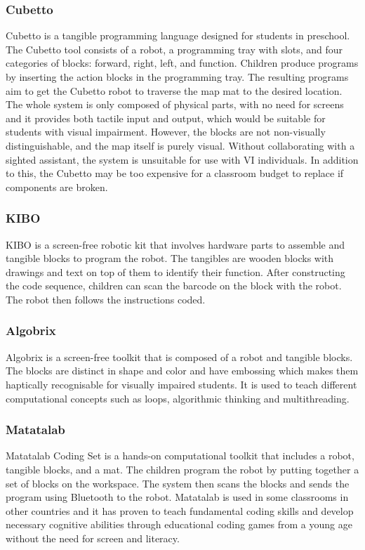 \documentclass[oneside,%
                    author={Malak Hajji},
                    degree={BSc},
                    title={Designing An Accessible Computational Toolkit For Students},
                  subtitle={With Mixed Visual Abilities}]{dissertation}
\begin{document}
\subsubsection{Cubetto}
Cubetto\cite{cubetto} is a tangible programming language designed for students in preschool. The Cubetto tool consists of a robot, a programming tray with slots, and four categories of blocks: forward, right, left, and function. Children produce programs by inserting the action blocks in the programming tray. The resulting programs aim to get the Cubetto robot to traverse the map mat to the desired location. The whole system is only composed of physical parts, with no need for screens and it provides both tactile input and output, which would be suitable for students with visual impairment. However, the blocks are not non-visually distinguishable, and the map itself is purely visual. Without collaborating with a sighted assistant, the system is unsuitable for use with VI individuals. In addition to this, the Cubetto may be too expensive for a classroom budget to replace if components are broken.  

\subsubsection{KIBO}
KIBO\cite{kibo} is a screen-free robotic kit that involves hardware parts to assemble and tangible blocks to program the robot. The tangibles are wooden blocks with drawings and text on top of them to identify their function. After constructing the code sequence, children can scan the barcode on the block with the robot. The robot then follows the instructions coded.  

\subsubsection{Algobrix}
Algobrix is a screen-free toolkit that is composed of a robot and tangible blocks. The blocks are distinct in shape and color and have embossing which makes them haptically recognisable for visually impaired students. It is used to teach different computational concepts such as loops, algorithmic thinking and multithreading. 

\subsubsection{Matatalab}
Matatalab Coding Set is a hands-on computational toolkit that includes a robot, tangible blocks, and a mat. The children program the robot by putting together a set of blocks on the workspace. The system then scans the blocks and sends the program using Bluetooth to the robot. Matatalab is used in some classrooms in other countries and it has proven to teach fundamental coding skills and develop necessary cognitive abilities through educational coding games from a young age without the need for screen and literacy. 
\end{document}
